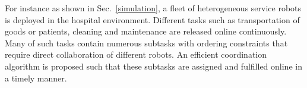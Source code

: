 {For instance as shown in Sec.~\ref{simulation},
  a fleet of heterogeneous service robots is deployed in the hospital environment.
  Different tasks such as transportation of goods or patients, cleaning and maintenance
  are released online continuously.
  Many of such tasks contain numerous subtasks  with ordering constraints
  that require direct collaboration of different robots.
  An efficient coordination algorithm is proposed such that these subtasks
  are assigned and fulfilled online in a timely manner.
}



